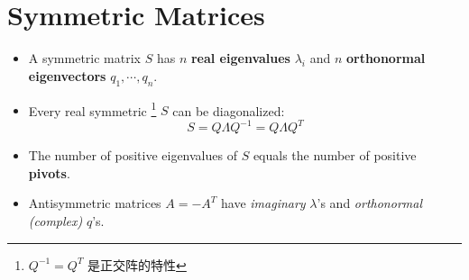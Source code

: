 \section{Symmetric Matrices}

\begin{itemize}
    \item A symmetric matrix $S$ has $n$ \textbf{real eigenvalues} $\lambda_i$ 
        and $n$ \textbf{orthonormal eigenvectors} $q_1, \cdots, q_n$.
    \item Every real symmetric
        \footnote{$Q^{-1} = Q^T$ 是正交阵的特性}
        $S$ can be diagonalized:
        \[
            S = Q\Lambda Q^{-1} = Q\Lambda Q^T
        \]
    \item The number of positive eigenvalues of $S$ equals the number of positive \textbf{pivots}.
    \item Antisymmetric matrices 
        $A = -A^T$ have \emph{imaginary} $\lambda$'s 
        and \emph{orthonormal (complex)} $q$'s.
\end{itemize}
